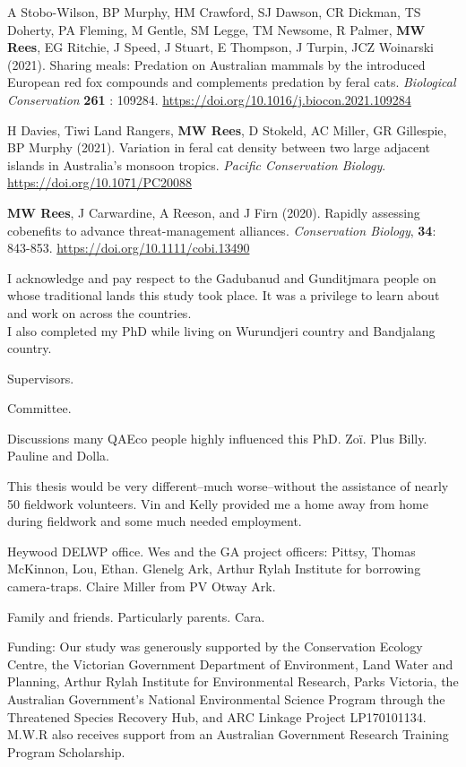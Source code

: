 \documentclass[11pt,a4paper,titlepage,twoside,openright]{style/unimelbthesis}
\begin{document}
\begin{frontmatter}
\begin{preface}
    A Stobo-Wilson, BP Murphy, HM Crawford, SJ Dawson, CR Dickman, TS Doherty, PA Fleming, M Gentle, SM Legge, TM Newsome, R Palmer, \textbf{MW Rees}, EG Ritchie, J Speed, J Stuart, E Thompson, J Turpin, JCZ Woinarski (2021). Sharing meals: Predation on Australian mammals by the introduced European red fox compounds and complements predation by feral cats. \emph{Biological Conservation} \textbf{261} : 109284. \url{https://doi.org/10.1016/j.biocon.2021.109284}
    
    H Davies, Tiwi Land Rangers, \textbf{MW Rees}, D Stokeld, AC Miller, GR Gillespie, BP Murphy (2021). Variation in feral cat density between two large adjacent islands in Australia's monsoon tropics. \emph{Pacific Conservation Biology}. \url{https://doi.org/10.1071/PC20088}
    
    \textbf{MW Rees}, J Carwardine, A Reeson, and J Firn (2020). Rapidly assessing cobenefits to advance threat-management alliances. \emph{Conservation Biology}, \textbf{34}: 843-853. \url{https://doi.org/10.1111/cobi.13490}
  \end{preface}
  \begin{acknowledgements}
    I acknowledge and pay respect to the Gadubanud and Gunditjmara people on whose traditional lands this study took place. It was a privilege to learn about and work on across the countries.\\
    I also completed my PhD while living on Wurundjeri country and Bandjalang country.
    
    Supervisors.
    
    Committee.
    
    Discussions many QAEco people highly influenced this PhD. Zoï. Plus Billy.
    Pauline and Dolla.
    
    This thesis would be very different--much worse--without the assistance of nearly 50 fieldwork volunteers.
    Vin and Kelly provided me a home away from home during fieldwork and some much needed employment.
    
    Heywood DELWP office. Wes and the GA project officers: Pittsy, Thomas McKinnon, Lou, Ethan.
    Glenelg Ark, Arthur Rylah Institute for borrowing camera-traps.
    Claire Miller from PV Otway Ark.
    
    Family and friends. Particularly parents. Cara.
    
    Funding:
    Our study was generously supported by the Conservation Ecology Centre, the Victorian Government Department of Environment, Land Water and Planning, Arthur Rylah Institute for Environmental Research, Parks Victoria, the Australian Government's National Environmental Science Program through the Threatened Species Recovery Hub, and ARC Linkage Project LP170101134. M.W.R also receives support from an Australian Government Research Training Program Scholarship.
  \end{acknowledgements}


\end{frontmatter}
\end{document}
